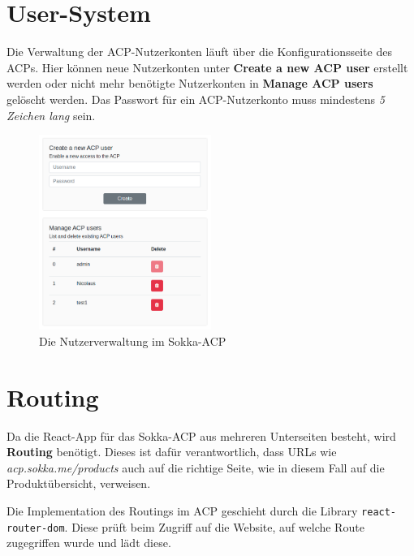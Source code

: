\section{User-System}
\label{acp-usersystem}

Die Verwaltung der ACP-Nutzerkonten läuft über die Konfigurationsseite des ACPs. Hier können neue Nutzerkonten unter \textbf{Create a new ACP user} erstellt werden oder nicht mehr benötigte Nutzerkonten in \textbf{Manage ACP users} gelöscht werden. Das Passwort für ein ACP-Nutzerkonto muss mindestens \textit{5 Zeichen lang} sein.

\begin{figure}[ht]
    \centering
    \includegraphics[width=0.5\textwidth]{images/ACP/users.png}
    \caption{Die Nutzerverwaltung im Sokka-ACP}
\end{figure}

\section{Routing}

Da die React-App für das Sokka-ACP aus mehreren Unterseiten besteht, wird \textbf{Routing} benötigt. Dieses ist dafür verantwortlich, dass URLs wie \textit{acp.sokka.me/products} auch auf die richtige Seite, wie in diesem Fall auf die Produktübersicht, verweisen.

Die Implementation des Routings im ACP geschieht durch die Library \lstinline{react-router-dom}. Diese prüft beim Zugriff auf die Website, auf welche Route zugegriffen wurde und lädt diese.

